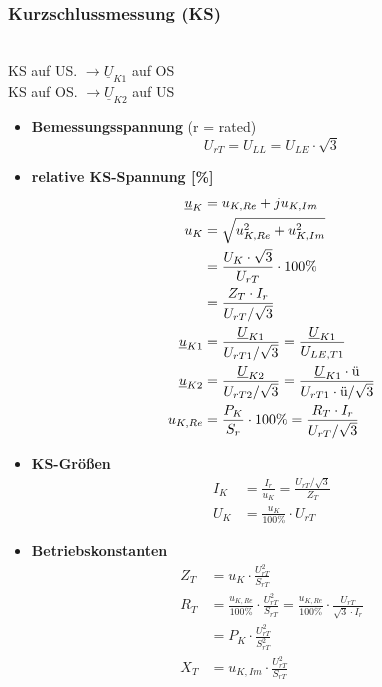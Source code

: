 \subsubsection{Kurzschlussmessung (KS)}\,\\
\setlength\parindent{20pt}\indent KS auf US. $\rightarrow  \underline{U}_{K1}$ auf OS\\
\indent KS auf OS. $\rightarrow \underline{U}_{K2}$ auf US
\begin{itemize}
    \item[]{\textbf{Bemessungsspannung} (r = rated)}
    \[
    U_{rT} = U_{LL} = U_{LE} \cdot \sqrt{3}
    \]

    \item[]{\textbf{relative KS-Spannung [\%]}}
    \begin{align*}
    \underline{u}_K &= u_{K,Re} + j u_{K,Im}\\
        u_K  &= \sqrt{u^2_{K,Re}+u^2_{K,Im}}\\
             &= \frac{U_K\cdot \sqrt{3}}{U_{rT}}\cdot 100\%\\
             &= \frac{Z_T \cdot I_r}{U_{rT}/\sqrt{3}}\\
    \underline{u}_{K1}  &= \frac{\underline{U}_{K1}}{ U_{rT1}/\sqrt{3} } =\frac{\underline{U}_{K1}}{U_{LE,T1}}\\
    \underline{u}_{K2} &= \frac{\underline{U}_{K2}}{ U_{rT2}/\sqrt{3}} = \frac{\underline{U}_{K1} \cdot \textnormal{ü}}{ U_{rT1} \cdot \textnormal{ü}/\sqrt{3}}\\
    u_{K,Re}      &= \frac{P_{K}}{S_{r}}\cdot 100\%=\frac{R_T \cdot I_r}{U_{rT}/\sqrt{3}}
    \end{align*}

    \item[]{\textbf{KS-Größen}}
    \begin{align*}
    I_K &= \frac{I_r}{u_K} = \frac{U_{rT}/\sqrt{3}}{Z_T}\\
    U_K &= \frac{u_K}{100\%} \cdot U_{rT}
    \end{align*}

    \item[]{\textbf{Betriebskonstanten}}
    \begin{align*}
    Z_T &= u_K \cdot \frac{U^2_{rT}}{S_{rT}} \\
    R_T &= \frac{u_{K,Re}}{100\%} \cdot \frac{U^2_{rT}}{S_{rT}} =
         \frac{u_{K,Re}}{100\%} \cdot \frac{U_{rT}}{\sqrt{3}\cdot I_r}\\
        &= P_K \cdot \frac{U^2_{rT}}{S^2_{rT}}\\
    X_T &= u_{K,Im} \cdot \frac{U^2_{rT}}{S_{rT}}
    \end{align*}


\end{itemize}
